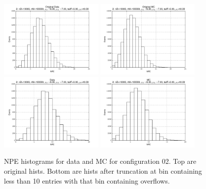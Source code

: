  \begin{figure}[htbp] \begin{center} 
\includegraphics[width=0.45\textwidth]{../FIGURES/02/FIG_Original_Data.pdf} 
\includegraphics[width=0.45\textwidth]{../FIGURES/02/FIG_Original_MC.pdf} 
\includegraphics[width=0.45\textwidth]{../FIGURES/02/FIG_Data.pdf} 
\includegraphics[width=0.45\textwidth]{../FIGURES/02/FIG_MC.pdf} 
\caption{NPE histograms for data and MC for configuration 02. Top are original hists. Bottom are hists after truncation at bin containing less than 10 entries with that bin containing overflows.} 
\label{tab:npe_02} 
\end{center} \end{figure} 

 